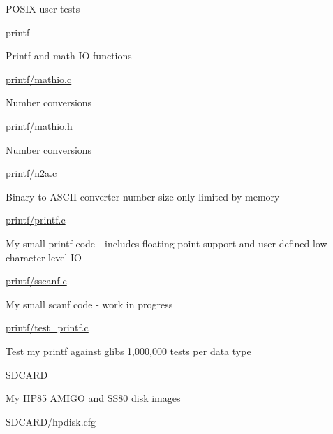 {\begin{DoxyItemize}
\begin{DoxyItemize}
\begin{DoxyItemize}
\item P\+O\+S\+IX user tests
\end{DoxyItemize}
\end{DoxyItemize}
\item printf
\begin{DoxyItemize}
\item Printf and math IO functions
\item \hyperlink{mathio_8c}{printf/mathio.\+c}
\begin{DoxyItemize}
\item Number conversions
\end{DoxyItemize}
\item \hyperlink{mathio_8h}{printf/mathio.\+h}
\begin{DoxyItemize}
\item Number conversions
\end{DoxyItemize}
\item \hyperlink{n2a_8c}{printf/n2a.\+c}
\begin{DoxyItemize}
\item Binary to A\+S\+C\+II converter number size only limited by memory
\end{DoxyItemize}
\item \hyperlink{printf_8c}{printf/printf.\+c}
\begin{DoxyItemize}
\item My small printf code -\/ includes floating point support and user defined low character level IO
\end{DoxyItemize}
\item \hyperlink{sscanf_8c}{printf/sscanf.\+c}
\begin{DoxyItemize}
\item My small scanf code -\/ work in progress
\end{DoxyItemize}
\item \hyperlink{test__printf_8c}{printf/test\+\_\+printf.\+c}
\begin{DoxyItemize}
\item Test my printf against glibs 1,000,000 tests per data type
\end{DoxyItemize}
\end{DoxyItemize}
\item S\+D\+C\+A\+RD
\begin{DoxyItemize}
\item My H\+P85 A\+M\+I\+GO and S\+S80 disk images
\begin{DoxyItemize}
\item S\+D\+C\+A\+R\+D/hpdisk.\+cfg
\begin{DoxyItemize}

\end{DoxyItemize}
\end{DoxyItemize}
\end{DoxyItemize}
\end{DoxyItemize}}
